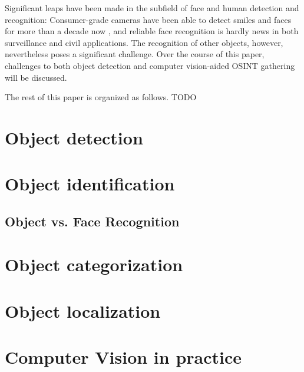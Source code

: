 \documentclass[twoside,a4paper]{article}
\begin{document}
Significant leaps have been made in the subfield of face and human detection and recognition: Consumer-grade cameras have been able to detect smiles and faces for more than a decade now , and reliable face recognition is hardly news in both surveillance and civil applications.
The recognition of other objects, however, nevertheless poses a significant challenge. Over the course of this paper, challenges to both object detection and computer vision-aided OSINT gathering will be discussed.

The rest of this paper is organized as follows. TODO


\section{Object detection}
\label{sec:object_det}


\section{Object identification}
\label{sec:object_id}

\subsection{Object vs. Face Recognition}
\label{subsec:object_vs_face}

\section{Object categorization}
\label{sec:object_cat}

\section{Object localization}
\label{sec:object_loc}


\section{Computer Vision in practice}
\label{sec:zusammenhang}
\end{document}
